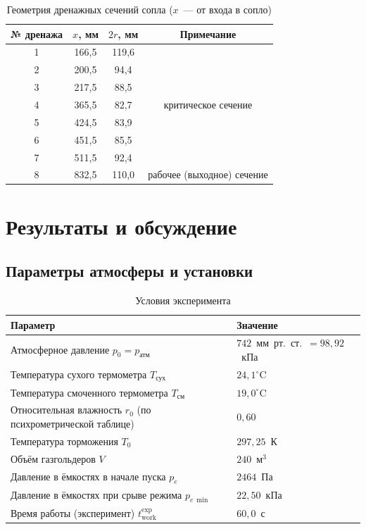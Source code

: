 \documentclass[12pt,a4paper]{article}
\begin{document}
\begin{table}[H]
    \centering
    \caption{Геометрия дренажных сечений сопла ($x$~--- от входа в сопло)}
    \label{tab:geom}
    \begin{tabular}{cccc}
        \toprule
        № дренажа & $x$, мм & $2r$, мм & Примечание \\
        \midrule
        1 & 166{,}5 & 119{,}6 &  \\
        2 & 200{,}5 & 94{,}4  &  \\
        3 & 217{,}5 & 88{,}5  &  \\
        4 & 365{,}5 & 82{,}7  & критическое сечение \\
        5 & 424{,}5 & 83{,}9  &  \\
        6 & 451{,}5 & 85{,}5  &  \\
        7 & 511{,}5 & 92{,}4  &  \\
        8 & 832{,}5 & 110{,}0 & рабочее (выходное) сечение \\
        \bottomrule
    \end{tabular}
\end{table}

\section{Результаты и обсуждение}

\subsection{Параметры атмосферы и установки}

\begin{table}[H]
    \centering
    \caption{Условия эксперимента}
    \label{tab:atm}
    \begin{tabular}{ll}
        \toprule
        Параметр & Значение \\
        \midrule
        Атмосферное давление $p_0 = p_{\text{атм}}$
            & $742$~мм~рт.~ст.\ $= 98{,}92$~кПа \\
        Температура сухого термометра $T_{\text{сух}}$
            & $24{,}1^\circ$C \\
        Температура смоченного термометра $T_{\text{см}}$
            & $19{,}0^\circ$C \\
        Относительная влажность $r_0$ (по психрометрической таблице)
            & $0{,}60$ \\
        Температура торможения $T_0$
            & $297{,}25$~К \\
        Объём газгольдеров $V$
            & $240$~м$^3$ \\
        Давление в ёмкостях в начале пуска $p_e$
            & $2464$~Па \\
        Давление в ёмкостях при срыве режима $p_{e\,\min}$
            & $22{,}50$~кПа \\
        Время работы (эксперимент) $t_{\mathrm{work}}^{\mathrm{exp}}$
            & $60{,}0$~с \\
        \bottomrule
    \end{tabular}
\end{table}
\end{document}
